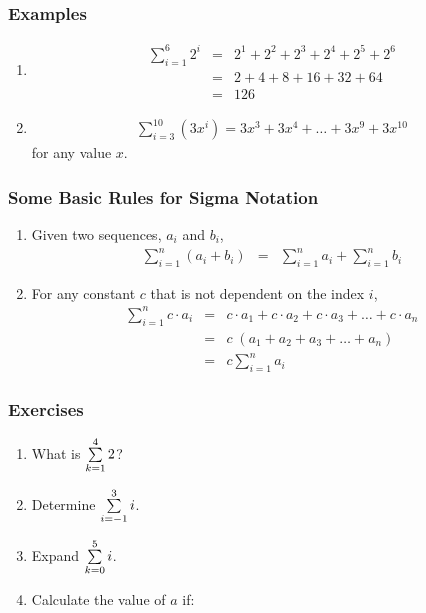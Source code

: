\subsubsection{Examples}

\begin{enumerate}
\item
\begin{eqnarray*}
\sum_{i=1}^6 2^i &=& 2^1 + 2^2 + 2^3 + 2^4 + 2^5 + 2^6 \\
&=& 2 + 4 + 8 + 16 + 32 + 64 \\
&=& 126
\end{eqnarray*}
\item
\begin{eqnarray*}
\sum_{i=3}^{10} (3x^i) = 3x^3 + 3x^4 + \ldots + 3x^9 + 3x^{10}
\end{eqnarray*}
for any value $x$.
\end{enumerate}

\subsubsection{Some Basic Rules for Sigma Notation}

\begin{enumerate}
\item {Given two sequences, $a_i$ and $b_i$,
\begin{eqnarray}
\label{eq:mp:series:sigma:rule1}
\sum_{i=1}^n (a_i + b_i) &=& \sum_{i=1}^n a_i + \sum_{i=1}^n b_i
\end{eqnarray}
}

\item {For any constant $c$ that is not dependent on the index $i$,
\begin{eqnarray}
\label{eq:mp:series:sigma:rule2}
\sum_{i=1}^n c \cdot a_i &=& c \cdot a_1 + c \cdot a_2 + c \cdot a_3 + \ldots + c \cdot a_n \nonumber \\
&=& c \; (a_1 + a_2 + a_3 + \ldots + a_n) \nonumber \\
&=& c \sum_{i=1}^n a_i
\end{eqnarray}
}
\end{enumerate}

\subsubsection{Exercises}
\begin{enumerate}
\item What is $\sum_{k=1}^4 \limits 2$?
\item Determine $\sum_{i=-1}^3 \limits i$.
\item Expand $\sum_{k=0}^5 \limits i$.
\item{Calculate the value of $a$ if:
}
\end{enumerate}

